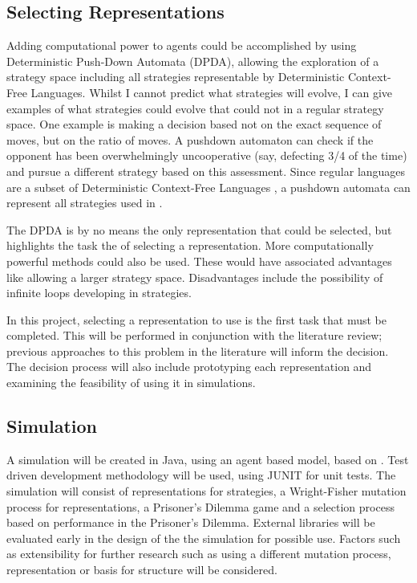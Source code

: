 \documentclass[a4paper,11pt]{article}
\begin{document}
\subsection{Selecting Representations}
Adding computational power to agents could be accomplished by using Deterministic Push-Down Automata (DPDA), allowing the exploration of a strategy space including all strategies representable by Deterministic Context-Free Languages. 
Whilst I cannot predict what strategies will evolve, I can give examples of what strategies could evolve that could not in a regular strategy space. 
One example is making a decision based not on the exact sequence of moves, but on the ratio of moves. 
A pushdown automaton can check if the opponent has been overwhelmingly uncooperative (say, defecting 3/4 of the time) and pursue a different strategy based on this assessment. 
Since regular languages are a subset of Deterministic Context-Free Languages \citep{Sipser2006}, a pushdown automata can represent all strategies used in \citet{van-veelen:PNAS:2012}. 

The DPDA is by no means the only representation that could be selected, but highlights the task the of selecting a representation. 
More computationally powerful methods could also be used. 
These would have associated advantages like allowing a larger strategy space. 
Disadvantages include the possibility of infinite loops developing in strategies.

In this project, selecting a representation to use is the first task that must be completed. 
This will be performed in conjunction with the literature review; previous approaches to this problem in the literature will inform the decision. 
The decision process will also include prototyping each representation and examining the feasibility of using it in simulations.
\subsection{Simulation}
A simulation will be created in Java, using an agent based model, based on \citet{van-veelen:PNAS:2012}. 
Test driven development methodology will be used, using JUNIT for unit tests. 
The simulation will consist of representations for strategies, a Wright-Fisher mutation process for representations, a Prisoner's Dilemma game and a selection process based on performance in the Prisoner's Dilemma. External libraries will be evaluated early in the design of the the simulation for possible use. 
Factors such as extensibility for further research such as using a different mutation process, representation or basis for structure will be considered. 
\end{document}
